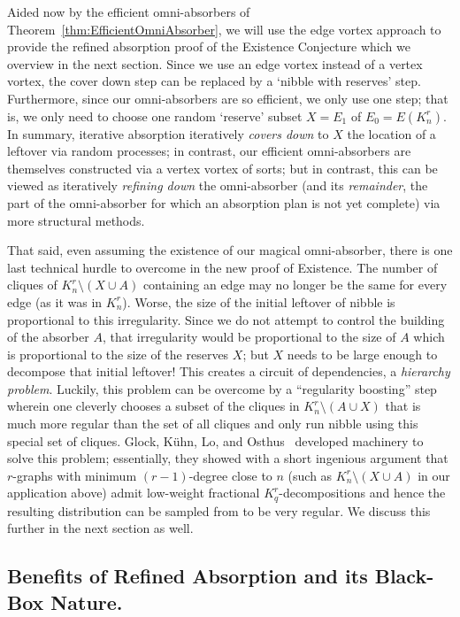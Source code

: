\documentclass[twoside,leqno]{article}
\begin{document}
Aided now by the efficient omni-absorbers of Theorem~\ref{thm:EfficientOmniAbsorber}, we will use the edge vortex approach to provide the refined absorption proof of the Existence Conjecture which we overview in the next section. Since we use an edge vortex instead of a vertex vortex, the cover down step can be replaced by a `nibble with reserves' step. Furthermore, since our omni-absorbers are so efficient, we only use one step; that is, we only need to choose one random `reserve' subset $X=E_1$ of $E_0=E(K_n^r)$. In summary, iterative absorption iteratively \emph{covers down} to $X$ the location of a leftover via random processes; in contrast, our efficient omni-absorbers are themselves constructed via a vertex vortex of sorts; but in contrast, this can be viewed as iteratively \emph{refining down} the omni-absorber (and its \emph{remainder}, the part of the omni-absorber for which an absorption plan is not yet complete) via more structural methods.

That said, even assuming the existence of our magical omni-absorber, there is one last technical hurdle to overcome in the new proof of Existence. The number of cliques of $K_n^r\setminus (X\cup A)$ containing an edge may no longer be the same for every edge (as it was in $K_n^r$). Worse, the size of the initial leftover of nibble is proportional to this irregularity. Since we do not attempt to control the building of the absorber $A$, that irregularity would be proportional to the size of $A$ which is proportional to the size of the reserves $X$; but $X$ needs to be large enough to decompose that initial leftover! This creates a circuit of dependencies, a \emph{hierarchy problem}. Luckily, this problem can be overcome by a ``regularity boosting'' step wherein one cleverly chooses a subset of the cliques in $K_n^r\setminus (A\cup X)$ that is much more regular than the set of all cliques and only run nibble using this special set of cliques. Glock, K\"uhn, Lo, and Osthus~\cite{GKLO16} developed machinery to solve this problem; essentially, they showed with a short ingenious argument that $r$-graphs with minimum $(r-1)$-degree close to $n$ (such as $K_n^r\setminus (X\cup A)$ in our application above) admit low-weight fractional $K_q^r$-decompositions and hence the resulting distribution can be sampled from to be very regular. We discuss this further in the next section as well.

\subsection{Benefits of Refined Absorption and its Black-Box Nature.}
\end{document}
